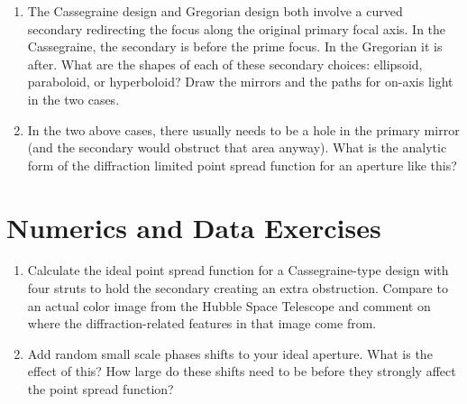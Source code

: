 \begin{enumerate}
\item The Cassegraine design and Gregorian design both involve a
curved secondary redirecting the focus along the original primary
focal axis. In the Cassegraine, the secondary is before the prime
focus. In the Gregorian it is after. What are the shapes of each of
these secondary choices: ellipsoid, paraboloid, or hyperboloid? Draw
the mirrors and the paths for on-axis light in the two cases.
\item In the two above cases, there usually needs to be a hole in the
primary mirror (and the secondary would obstruct that area anyway).
What is the analytic form of the diffraction limited point spread
function for an aperture like this?
\end{enumerate}

\section{Numerics and Data Exercises}

\begin{enumerate}
\item Calculate the ideal point spread function for a Cassegraine-type
design with four struts to hold the secondary creating an extra
obstruction. Compare to an actual color image from the Hubble Space
Telescope and comment on where the diffraction-related features in
that image come from.
\item Add random small scale phases shifts to your ideal
aperture. What is the effect of this? How large do these shifts need
to be before they strongly affect the point spread function?
\end{enumerate}


  
